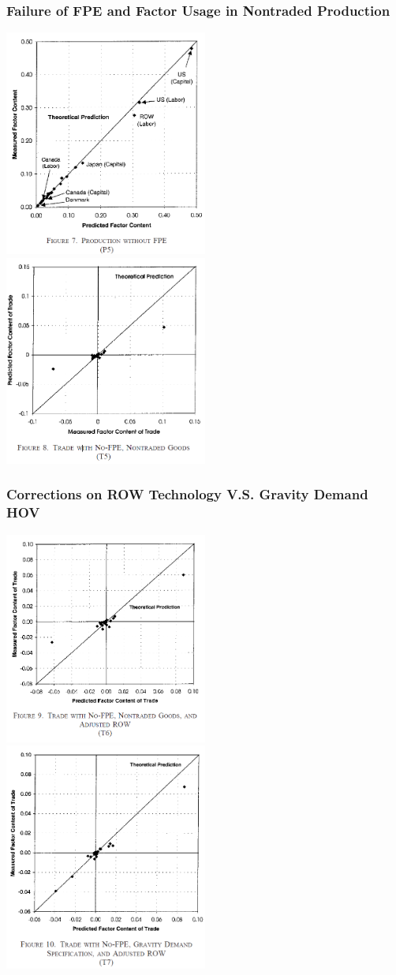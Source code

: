\documentclass[xcolor=svgnames,10pt]{beamer}
\begin{document}
\begin{frame}[c]\frametitle{Failure of FPE and Factor Usage in Nontraded Production}
\includegraphics[width=0.5\textwidth]{P5.png}
\includegraphics[width=0.5\textwidth]{T5.png}
\end{frame}
\begin{frame}[c]\frametitle{Corrections on ROW Technology V.S. Gravity Demand HOV}
\includegraphics[width=0.5\textwidth]{T6.png}
\includegraphics[width=0.5\textwidth]{T7.png}
\end{frame}
\end{document}

